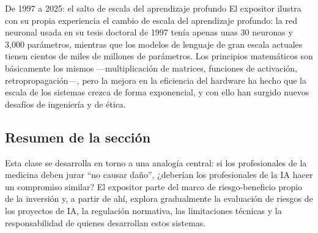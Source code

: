 \begin{knowledgebox}{De 1997 a 2025: el salto de escala del aprendizaje profundo}
El expositor ilustra con su propia experiencia el cambio de escala del aprendizaje profundo: la red neuronal usada en su tesis doctoral de 1997 tenía apenas unas 30 neuronas y 3,000 parámetros, mientras que los modelos de lenguaje de gran escala actuales tienen cientos de miles de millones de parámetros. Los principios matemáticos son básicamente los mismos —multiplicación de matrices, funciones de activación, retropropagación—, pero la mejora en la eficiencia del hardware ha hecho que la escala de los sistemas crezca de forma exponencial, y con ello han surgido nuevos desafíos de ingeniería y de ética.
\end{knowledgebox}

\subsection{Resumen de la sección}

Esta clase se desarrolla en torno a una analogía central: si los profesionales de la medicina deben jurar ``no causar daño'', ¿deberían los profesionales de la IA hacer un compromiso similar? El expositor parte del marco de riesgo-beneficio propio de la inversión y, a partir de ahí, explora gradualmente la evaluación de riesgos de los proyectos de IA, la regulación normativa, las limitaciones técnicas y la responsabilidad de quienes desarrollan estos sistemas.
